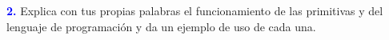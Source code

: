 \Large\textbf{\textcolor{blue}{2.}}
Explica con tus propias palabras el funcionamiento de las primitivas  y
 del lenguaje de programación  y da un ejemplo de uso de cada una.\\
